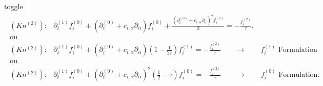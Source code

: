 \documentclass[letterpaper,10pt,english,openany,oneside]{jupyterBook}
\begin{document}
\begin{sphinxuseclass}{toggle}
\begin{equation}
\begin{split}
\begin{array}{ll}
    (Kn^{(2)}):& \partial_{t}^{(1)} f_{i}^{(0)} + \left( \partial_{t}^{(0)} + c_{i,\alpha}\partial_{\alpha} \right)f_{i}^{(0)} + \displaystyle\frac{\left( \partial_{t}^{(0)} + c_{i,\alpha}\partial_{\alpha} \right)^{2} f_{i}^{(0)}}{2}= - \displaystyle\frac{ f_{i}^{(2)} }{ \tau },\\
    \textrm{ou}& \\
    (Kn^{(2)}):& \partial_{t}^{(1)} f_{i}^{(0)} + \left( \partial_{t}^{(0)} + c_{i,\alpha}\partial_{\alpha} \right)\displaystyle\left(1 - \frac{1}{2\tau}\right) f_{i}^{(1)} =  - \displaystyle\frac{ f_{i}^{(2)} }{ \tau } \quad\quad \rightarrow \quad\quad  f_{i}^{(1)}\textrm{ Formulation} \\
    \textrm{ou}& \\
    (Kn^{(2)}):& \partial_{t}^{(1)} f_{i}^{(0)} + \left( \partial_{t}^{(0)} + c_{i,\alpha}\partial_{\alpha} \right)^{2} \displaystyle\left(\frac{1}{2} - \tau\right) f_{i}^{(0)} =  - \displaystyle\frac{ f_{i}^{(2)} }{ \tau } \quad\quad \rightarrow  \quad\quad f_{i}^{(0)}\textrm{ Formulation}.
 \end{array}
\end{split}
\end{equation}
\sphinxAtStartPar
{}


\end{sphinxuseclass}
\end{document}
